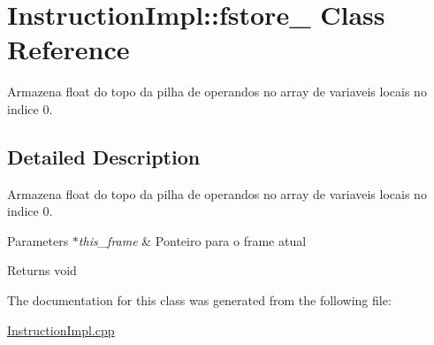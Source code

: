 \hypertarget{class_instruction_impl_1_1fstore__0}{}\section{Instruction\+Impl\+:\+:fstore\+\_ Class Reference}
\label{class_instruction_impl_1_1fstore__0}


Armazena float do topo da pilha de operandos no array de variaveis locais no indice 0.  




\subsection{Detailed Description}
Armazena float do topo da pilha de operandos no array de variaveis locais no indice 0. 


\begin{DoxyParams}{Parameters}
{\em $\ast$this\+\_\+frame} & Ponteiro para o frame atual \\
\hline
\end{DoxyParams}
\begin{DoxyReturn}{Returns}
void 
\end{DoxyReturn}


The documentation for this class was generated from the following file\+:\begin{DoxyCompactItemize}
\item 
\hyperlink{_instruction_impl_8cpp}{Instruction\+Impl.\+cpp}\end{DoxyCompactItemize}
